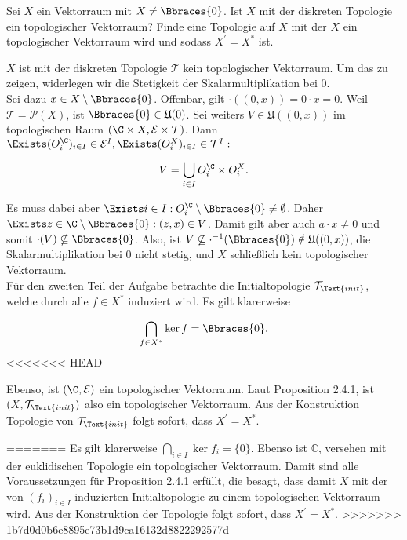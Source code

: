 \begin{exercise}

Sei $X$ ein Vektorraum mit $X \neq \Bbraces{0}$.
Ist $X$ mit der diskreten Topologie ein topologischer Vektorraum?
Finde eine Topologie auf $X$ mit der $X$ ein topologischer Vektorraum wird und sodass $X^\prime = X^\ast$ ist.

\end{exercise}

\begin{solution}

$X$ ist mit der diskreten Topologie $\mathcal{T}$ kein topologischer Vektorraum.
Um das zu zeigen, widerlegen wir die Stetigkeit der Skalarmultiplikation bei $0$. \\


Sei dazu $x \in X \setminus \Bbraces{0}$.
Offenbar, gilt $\cdot((0, x)) = 0 \cdot x = 0$.
Weil $\mathcal{T} = \mathcal{P}(X)$, ist $\Bbraces{0} \in \mathfrak{U}(0)$.
Sei weiters $V \in \mathfrak{U}((0, x))$ im topologischen Raum $(\C \times X, \mathcal{E} \times \mathcal{T})$.
Dann $\Exists (O_i^\C)_{i \in I} \in \mathcal{E}^I, \Exists (O_i^X)_{i \in I} \in \mathcal{T}^I:$

\begin{align*}
  V = \bigcup_{i \in I} O_i^\C \times O_i^X.
\end{align*}

Es muss dabei aber $\Exists i \in I: O_i^\C \setminus \Bbraces{0} \neq \emptyset$.
Daher $\Exists z \in \C \setminus \Bbraces{0}: (z, x) \in V$.
Damit gilt aber auch $a \cdot x \neq 0$ und somit $\cdot(V) \nsubseteq \Bbraces{0}$.
Also, ist $V \not \subseteq \cdot^{-1}(\Bbraces{0}) \notin \mathfrak{U}((0, x))$, die Skalarmultiplikation bei $0$ nicht stetig, und $X$ schließlich kein topologischer Vektorraum. \\

Für den zweiten Teil der Aufgabe betrachte die Initialtopologie $\mathcal{T}_\Text{init}$, welche durch alle $f \in X^\ast$ induziert wird.
Es gilt klarerweise

\begin{align*}
  \bigcap_{f \in X^\ast} \ker f = \Bbraces{0}.
\end{align*}
<<<<<<< HEAD

Ebenso, ist $(\C, \mathcal{E})$ ein topologischer Vektorraum.
Laut Proposition 2.4.1, ist $(X, \mathcal{T}_\Text{init})$ also ein topologischer Vektorraum.
Aus der Konstruktion Topologie von $\mathcal{T}_\Text{init}$ folgt sofort, dass $X^\prime = X^\ast$.

=======
Es gilt klarerweise $\bigcap_{i\in I}\ker f_i = \{0\}$.
Ebenso ist $\mathbb{C}$, versehen mit der euklidischen Topologie ein topologischer Vektorraum.
Damit sind alle Voraussetzungen für Proposition 2.4.1 erfüllt, die besagt, dass
damit $X$ mit der von $(f_i)_{i\in I}$ induzierten Initialtopologie zu einem topologischen Vektorraum wird.
Aus der Konstruktion der Topologie folgt sofort, dass $X^\prime = X^\ast$.
>>>>>>> 1b7d0d0b6e8895e73b1d9ca16132d8822292577d
\end{solution}

